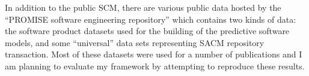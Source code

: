 In addition to the public SCM, there are various public data hosted by the ``PROMISE software engineering repository'' \cite{Sayyad:2005} which contains two kinds of data: the software product datasets used for the building of the predictive software models, and some ``universal'' data sets representing SACM repository transaction. Most of these datasets were used for a number of publications and I am planning to evaluate my framework by attempting to reproduce these results. 